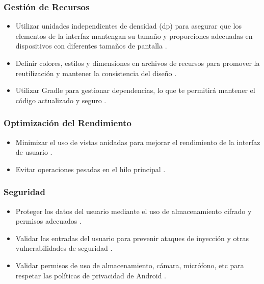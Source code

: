 \subsubsection{Gestión de Recursos}
\begin{itemize}
    \item Utilizar unidades independientes de densidad (dp) para asegurar que los elementos de la interfaz mantengan su tamaño y proporciones adecuadas en dispositivos con diferentes tamaños de pantalla \cite{PhillipsStewart2022}.
    \item Definir colores, estilos y dimensiones en archivos de recursos para promover la reutilización y mantener la consistencia del diseño \cite{PhillipsStewart2022}.
    \item Utilizar Gradle para gestionar dependencias, lo que te permitirá mantener el código actualizado y seguro \cite{PhillipsStewart2022}.
\end{itemize}

\subsubsection{Optimización del Rendimiento}
\begin{itemize}
    \item Minimizar el uso de vistas anidadas para mejorar el rendimiento de la interfaz de usuario \cite{PhillipsStewart2022}.
    \item Evitar operaciones pesadas en el hilo principal \cite{PhillipsStewart2022}.
\end{itemize}

\subsubsection{Seguridad}
\begin{itemize}
    \item Proteger los datos del usuario mediante el uso de almacenamiento cifrado y permisos adecuados \cite{PhillipsStewart2022}.
    \item Validar las entradas del usuario para prevenir ataques de inyección y otras vulnerabilidades de seguridad \cite{PhillipsStewart2022}.
    \item Validar permisos de uso de almacenamiento, cámara, micrófono, etc para respetar las políticas de privacidad de Android \cite{PhillipsStewart2022}.
\end{itemize}

